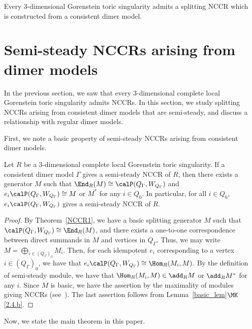 \begin{coro}
Every $3$-dimensional Gorenstein toric singularity admits a splitting NCCR which is constructed from a consistent dimer model.
\end{coro}


\section{Semi-steady NCCRs arising from dimer models}\label{sec_semisteady_dimer}

In the previous section, we saw that every $3$-dimensional complete local Gorenstein toric singularity admits NCCRs. In this section, we study splitting NCCRs arising from consistent dimer models that are semi-steady, and discuss a relationship with regular dimer models.

First, we note a basic property of semi-steady NCCRs arising from consistent dimer models.

\begin{lemm}\label{lem_semi}
Let $R$ be a $3$-dimensional complete local Gorenstein toric singularity. If a consistent dimer model $\Gamma$ gives a semi-steady NCCR of $R$, then there exists a generator $M$ such that $\End_R(M)\cong\calP(Q_\Gamma,W_{Q_\Gamma})$ and $e_i\calP(Q_\Gamma,W_{Q_\Gamma})\cong M$ or $M^*$ for any $i\in Q_0$. In particular, for all $i\in Q_0$, $e_i\calP(Q_\Gamma,W_{Q_\Gamma})$ gives a semi-steady NCCR of $R$.
\end{lemm}

\begin{proof}
By Theorem~\ref{NCCR1}, we have a basic splitting generator $M$ such that\break $\calP(Q_\Gamma,W_{Q_\Gamma})\cong\End_R(M)$, and there exists a one-to-one correspondence between direct summands in $M$ and vertices in $Q_\Gamma$. Thus, we may write $M=\bigoplus_{i\in(Q_\Gamma)_0}M_i$. Then, for each idempotent $e_i$ corresponding to a vertex $i\in(Q_\Gamma)_0$, we have that $e_i\calP(Q_\Gamma,W_{Q_\Gamma})\cong\Hom_R(M_i,M)$. By the definition of semi-steady module, we have that $\Hom_R(M_i,M)\in\add_RM$ or $\add_RM^*$ for any $i$. Since $M$ is basic, we have the assertion by the maximality of modules giving NCCRs (see~\cite[Proposition~4.5]{IW2}). The last assertion follows from Lemma~\ref{basic_lem}$\MK$\eqref{2.4.b}.
\end{proof}

Now, we state the main theorem in this paper.

